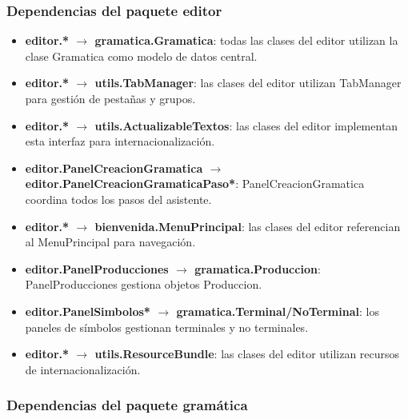 \subsubsection{Dependencias del paquete editor}

\begin{itemize}
    \item \textbf{editor.* $\rightarrow$ gramatica.Gramatica}: todas las clases del editor utilizan la clase Gramatica como modelo de datos central.
    \item \textbf{editor.* $\rightarrow$ utils.TabManager}: las clases del editor utilizan TabManager para gestión de pestañas y grupos.
    \item \textbf{editor.* $\rightarrow$ utils.ActualizableTextos}: las clases del editor implementan esta interfaz para internacionalización.
    \item \textbf{editor.PanelCreacionGramatica $\rightarrow$ editor.PanelCreacionGramaticaPaso*}: PanelCreacionGramatica coordina todos los pasos del asistente.
    \item \textbf{editor.* $\rightarrow$ bienvenida.MenuPrincipal}: las clases del editor referencian al MenuPrincipal para navegación.
    \item \textbf{editor.PanelProducciones $\rightarrow$ gramatica.Produccion}: PanelProducciones gestiona objetos Produccion.
    \item \textbf{editor.PanelSimbolos* $\rightarrow$ gramatica.Terminal/NoTerminal}: los paneles de símbolos gestionan terminales y no terminales.
    \item \textbf{editor.* $\rightarrow$ utils.ResourceBundle}: las clases del editor utilizan recursos de internacionalización.
\end{itemize}

\subsubsection{Dependencias del paquete gramática}


